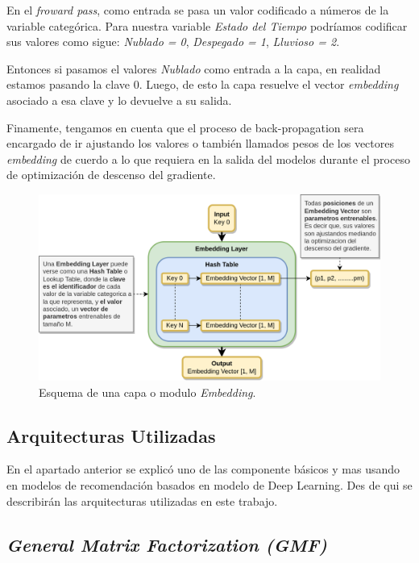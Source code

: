\documentclass[11pt,a4paper,twoside]{thesis}
\begin{document}
En el \textit{froward pass}, como entrada se pasa un valor codificado a números
de la variable categórica. Para nuestra variable \textit{Estado del Tiempo}
podríamos codificar sus valores como sigue: \textit{Nublado = 0},
\textit{Despegado = 1}, \textit{Lluvioso = 2}.

Entonces si pasamos el valores \textit{Nublado} como entrada a la capa, en
realidad estamos pasando la clave 0. Luego, de esto la capa resuelve el vector
\textit{embedding} asociado a esa clave y lo devuelve a su salida.

Finamente, tengamos en cuenta que el proceso de back-propagation sera encargado
de ir ajustando los valores o también llamados pesos de los vectores
\textit{embedding} de cuerdo a lo que requiera en la salida del modelos durante
el proceso de optimización de descenso del gradiente.

\begin{figure}[ht!]
	\centering
	\includegraphics[width=13cm]{./images/Embedding-Layer.png}
	\caption{Esquema de una capa o modulo \textit{Embedding}.}
	\label{fig:embeddingLayer}
\end{figure}

\clearpage

\subsection{Arquitecturas Utilizadas}

En el apartado anterior se explicó uno de las componente básicos y mas usando
en modelos de recomendación basados en modelo de Deep Learning. Des de qui se
describirán las arquitecturas utilizadas en este trabajo.

\subsection{\textit{General Matrix Factorization (GMF)}}
\end{document}
